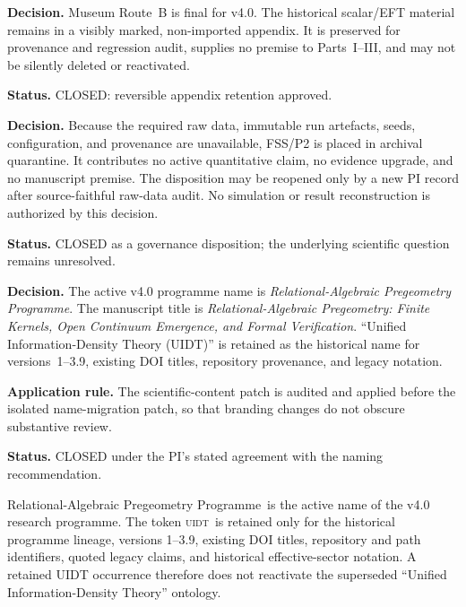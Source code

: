 \documentclass[12pt,a4paper,twoside]{article}
\theoremstyle{plain}
\theoremstyle{definition}
\theoremstyle{remark}
\newcommand{\ProjectName}{Relational-Algebraic Pregeometry Programme}
\newcommand{\UIDT}{\textsc{uidt}} %
\begin{document}
\begin{pioverridebox}
\label{box:pi-decision-d23-museum}
\textbf{Decision.} Museum Route~B is final for v4.0. The historical scalar/EFT
material remains in a visibly marked, non-imported appendix. It is preserved
for provenance and regression audit, supplies no premise to Parts~I--III, and
may not be silently deleted or reactivated.

\textbf{Status.} CLOSED: reversible appendix retention approved.
\end{pioverridebox}

\begin{pioverridebox}
\label{box:pi-decision-d24-p2}
\textbf{Decision.} Because the required raw data, immutable run artefacts,
seeds, configuration, and provenance are unavailable, FSS/P2 is placed in
archival quarantine. It contributes no active quantitative claim, no evidence
upgrade, and no manuscript premise. The disposition may be reopened only by a
new PI record after source-faithful raw-data audit. No simulation or result
reconstruction is authorized by this decision.

\textbf{Status.} CLOSED as a governance disposition; the underlying
scientific question remains unresolved.
\end{pioverridebox}

\begin{pioverridebox}
\label{box:pi-decision-d25-name}
\textbf{Decision.} The active v4.0 programme name is
\emph{Relational-Algebraic Pregeometry Programme}. The manuscript title is
\emph{Relational-Algebraic Pregeometry: Finite Kernels, Open Continuum
Emergence, and Formal Verification}. ``Unified Information-Density Theory
(UIDT)'' is retained as the historical name for versions~1--3.9, existing DOI
titles, repository provenance, and legacy notation.

\textbf{Application rule.} The scientific-content patch is audited and
applied before the isolated name-migration patch, so that branding changes do
not obscure substantive review.

\textbf{Status.} CLOSED under the PI's stated agreement with the naming
recommendation.
\end{pioverridebox}

\begin{governancebox}
\ProjectName\ is the active name of the v4.0 research programme. The token
\UIDT\ is retained only for the historical programme lineage, versions
1--3.9, existing DOI titles, repository and path identifiers, quoted legacy
claims, and historical effective-sector notation. A retained UIDT occurrence
therefore does not reactivate the superseded ``Unified Information-Density
Theory'' ontology.
\end{governancebox}
\end{document}
